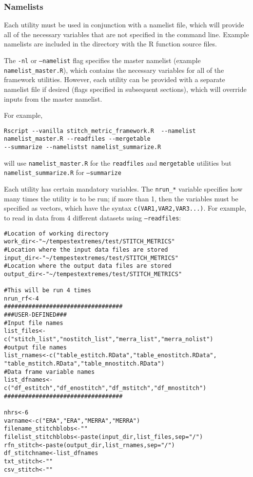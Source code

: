 \documentclass{article}
\begin{document}
\subsubsection{Namelists}
Each utility must be used in conjunction with a namelist file, which will provide all of the necessary variables that are not specified in the command line. Example namelists are included in the directory with the R function source files.

The \texttt{-nl} or \texttt{--namelist} flag specifies the master namelist (example \texttt{namelist\_master.R}), which contains the necessary variables for all of the framework utilities. However, each utility can be provided with a separate namelist file if desired (flags specified in subsequent sections), which will override inputs from the master namelist.

For example, 

\begin{verbatim}
Rscript --vanilla stitch_metric_framework.R  --namelist namelist_master.R --readfiles --mergetable
--summarize --namelistst namelist_summarize.R
\end{verbatim}

will use \texttt{namelist\_master.R} for the \texttt{readfiles} and \texttt{mergetable} utilities but \texttt{namelist\_summarize.R} for \texttt{--summarize}

Each utility has certain mandatory variables. The \texttt{nrun\_*} variable specifies how many times the utility is to be run; if more than 1, then the variables must be specified as vectors, which have the syntax \texttt{c(VAR1,VAR2,VAR3...)}. For example, to read in data from 4 different datasets using \texttt{--readfiles}:

\begin{verbatim}
#Location of working directory
work_dir<-"~/tempestextremes/test/STITCH_METRICS"
#Location where the input data files are stored
input_dir<-"~/tempestextremes/test/STITCH_METRICS"
#Location where the output data files are stored
output_dir<-"~/tempestextremes/test/STITCH_METRICS"

#This will be run 4 times 
nrun_rf<-4
##################################
###USER-DEFINED###
#Input file names
list_files<-c("stitch_list","nostitch_list","merra_list","merra_nolist")
#output file names
list_rnames<-c("table_estitch.RData","table_enostitch.RData",
"table_mstitch.RData","table_mnostitch.RData")
#Data frame variable names
list_dfnames<-c("df_estitch","df_enostitch","df_mstitch","df_mnostitch")
##################################

nhrs<-6
varname<-c("ERA","ERA","MERRA","MERRA")
filename_stitchblobs<-""
filelist_stitchblobs<-paste(input_dir,list_files,sep="/")
rfn_stitch<-paste(output_dir,list_rnames,sep="/")
df_stitchname<-list_dfnames
txt_stitch<-""
csv_stitch<-""
\end{verbatim}
\end{document}
